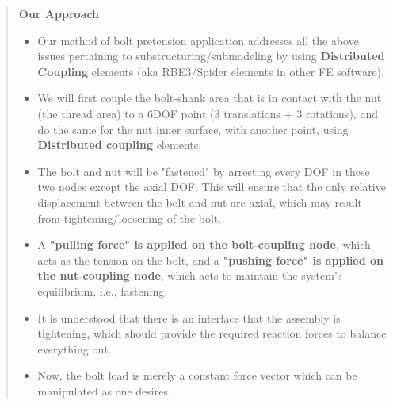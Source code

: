 \documentclass[11pt]{article}
\begin{document}
\begin{quote}
\begin{tcolorbox}[colback=osbe-bg,colframe=osbe-fg,title={What 's wrong with the inbuilt Bolt Pretension in ABAQUS?},sharp corners,boxrule=0.4pt]
\textbf{Our Approach}
\begin{itemize}
\item Our method of bolt pretension application addresses all the above issues pertaining to substructuring/submodeling by using \textbf{Distributed Coupling} elements (aka RBE3/Spider elements in other FE software).
\item We will first couple the bolt-shank area that is in contact with the nut (the thread area) to a 6DOF point (3 translations + 3 rotations), and do the same for the nut inner surface, with another point, using \textbf{Distributed coupling} elements.
\item The bolt and nut will be "fastened" by arresting every DOF in these two nodes except the axial DOF. This will ensure that the only relative displacement between the bolt and nut are axial, which may result from tightening/loosening of the bolt.
\item A \textbf{"pulling force" is applied on the bolt-coupling node}, which acts as the tension on the bolt, and a \textbf{"pushing force" is applied on the nut-coupling node}, which acts to maintain the system's equilibrium, i.e., fastening.
\item It is understood that there is an interface that the assembly is tightening, which should provide the required reaction forces to balance everything out.
\item Now, the bolt load is merely a constant force vector which can be manipulated as one desires.
\end{itemize}


               \end{tcolorbox}
\end{quote}
\end{document}

